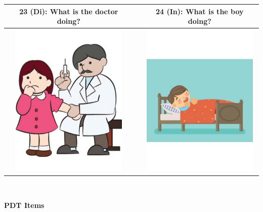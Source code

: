 \begin{tabular}{|c|c|c|}
\hline
23 (Di): What is the doctor doing? && 24 (In): What is the boy doing? \\
\hline
\includegraphics[width=15em,trim=0 0 0 -3]{figures/I23.jpg} & & \includegraphics[width=15em,trim=0 0 0 -3]{figures/I24.jpg} \\
\hline
\end{tabular}
\vspace{1em} \\


\clearpage

{\large \textbf{PDT Items}}

\vspace{2em}

